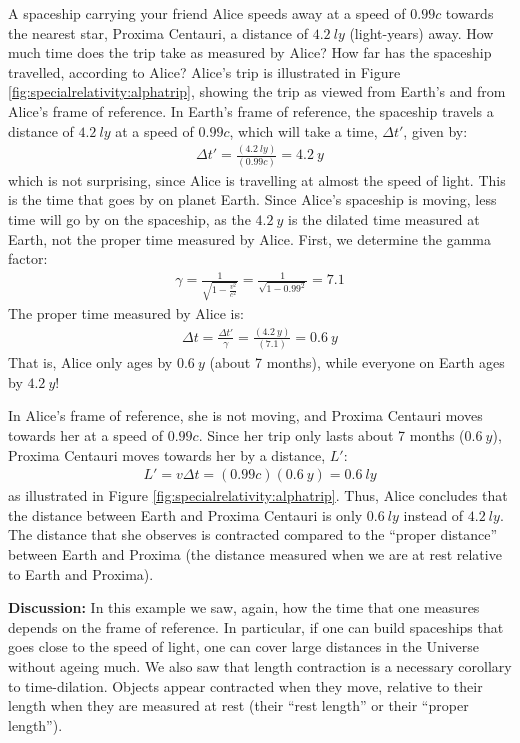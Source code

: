 \vspace{-0.3cm}
\begin{example}{\label{ex:specialrelativity:alphatrip}A spaceship carrying your friend Alice speeds away at a speed of $0.99c$ towards the nearest star, Proxima Centauri, a distance of $\SI{4.2}{ly}$ (light-years) away. How much time does the trip take as measured by Alice? How far has the spaceship travelled, according to Alice?}
Alice's trip is illustrated in Figure \ref{fig:specialrelativity:alphatrip}, showing the trip as viewed from Earth's and from Alice's frame of reference.
In Earth's frame of reference, the spaceship travels a distance of $\SI{4.2}{ly}$ at a speed of $0.99c$, which will take a time, $\Delta t'$, given by:
\begin{align*}
\Delta t' = \frac{(\SI{4.2}{ly})}{(0.99c)}=\SI{4.2}{y}
\end{align*}
which is not surprising, since Alice is travelling at almost the speed of light. This is the time that goes by on planet Earth. Since Alice's spaceship is moving, less time will go by on the spaceship, as the $\SI{4.2}{y}$ is the dilated time measured at Earth, not the proper time measured by Alice. First, we determine the gamma factor:
\begin{align*}
\gamma = \frac{1}{\sqrt{1-\frac{v^2}{c^2}}} =\frac{1}{\sqrt{1-0.99^2}}=7.1
\end{align*}
The proper time measured by Alice is:
\begin{align*}
\Delta t = \frac{\Delta t'}{\gamma}=\frac{(\SI{4.2}{y})}{(7.1)}=\SI{0.6}{y}
\end{align*}
That is, Alice only ages by $\SI{0.6}{y}$ (about 7 months), while everyone on Earth ages by $\SI{4.2}{y}$!

In Alice's frame of reference, she is not moving, and Proxima Centauri moves towards her at a speed of $0.99c$. Since her trip only lasts about 7 months ($\SI{0.6}{y}$), Proxima Centauri moves towards her by a distance, $L'$:
\begin{align*}
L'=v\Delta t=(0.99c)(\SI{0.6}{y})=\SI{0.6}{ly}
\end{align*}
as illustrated in Figure \ref{fig:specialrelativity:alphatrip}. Thus, Alice concludes that the distance between Earth and Proxima Centauri is only $\SI{0.6}{ly}$ instead of $\SI{4.2}{ly}$. The distance that she observes is contracted compared to the ``proper distance'' between Earth and Proxima (the distance measured when we are at rest relative to Earth and Proxima).

\textbf{Discussion: }In this example we saw, again, how the time that one measures depends on the frame of reference. In particular, if one can build spaceships that goes close to the speed of light, one can cover large distances in the Universe without ageing much. We also saw that length contraction is a necessary corollary to time-dilation. Objects appear contracted when they move, relative to their length when they are measured at rest (their ``rest length'' or their ``proper length'').
\end{example}
